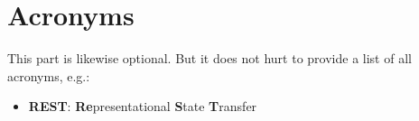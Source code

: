 \chapter*{\rm\bfseries Acronyms}
\label{ch:acronyms}

This part is likewise optional. But it does not hurt to provide a list of all acronyms, e.g.:

\begin{itemize}
    \item{\textbf{REST}: \textbf{Re}presentational \textbf{S}tate \textbf{T}ransfer}
\end{itemize}
